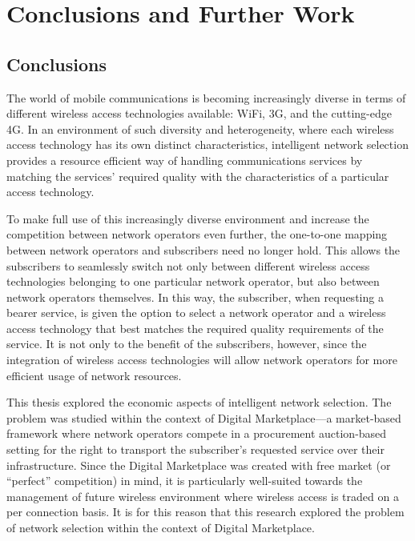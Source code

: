 \chapter{Conclusions and Further Work}
\label{cha:conclusions}

\minitoc
\vspace{10mm}

\section{Conclusions} %
\label{sec:conclusions_conclusions}
The world of mobile communications is becoming increasingly diverse in terms of different wireless access technologies available: WiFi, 3G, and the cutting-edge 4G. In an environment of such diversity and heterogeneity, where each wireless access technology has its own distinct characteristics, intelligent network selection provides a resource efficient way of handling communications services by matching the services' required quality with the characteristics of a particular access technology.

To make full use of this increasingly diverse environment and increase the competition between network operators even further, the one-to-one mapping between network operators and subscribers need no longer hold. This allows the subscribers to seamlessly switch not only between different wireless access technologies belonging to one particular network operator, but also between network operators themselves. In this way, the subscriber, when requesting a bearer service, is given the option to select a network operator and a wireless access technology that best matches the required quality requirements of the service. It is not only to the benefit of the subscribers, however, since the integration of wireless access technologies will allow network operators for more efficient usage of network resources.

This thesis explored the economic aspects of intelligent network selection. The problem was studied within the context of Digital Marketplace---a market-based framework where network operators compete in a procurement auction-based setting for the right to transport the subscriber's requested service over their infrastructure. Since the Digital Marketplace was created with free market (or ``perfect'' competition) in mind, it is particularly well-suited towards the management of future wireless environment where wireless access is traded on a per connection basis. It is for this reason that this research explored the problem of network selection within the context of Digital Marketplace.

